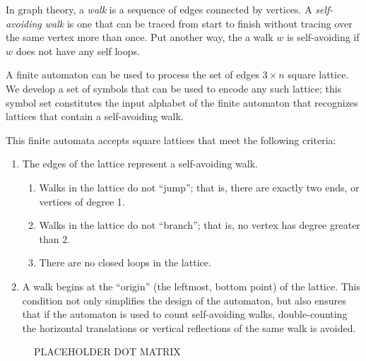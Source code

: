 In graph theory, a \emph{walk} is a sequence of edges connected by vertices. A \emph{self-avoiding walk} is one that can be traced from start to finish without tracing over the same vertex more than once. Put another way, the a walk $w$ is self-avoiding if $w$ does not have any self loops.

A finite automaton can be used to process the set of edges $3\times n$ square lattice. We develop a set of symbols that can be used to encode any such lattice; this symbol set constitutes the input alphabet of the finite automaton that recognizes lattices that contain a self-avoiding walk.

This finite automata accepts square lattices that meet the following criteria:
\begin{enumerate}
\item The edges of the lattice represent a self-avoiding walk.
\begin{enumerate}
\item Walks in the lattice do not ``jump''; that is, there are exactly two ends, or vertices of degree 1.
\item Walks in the lattice do not ``branch''; that is, no vertex has degree greater than 2.
\item There are no closed loops in the lattice.
\end{enumerate}
\item A walk begins at the ``origin'' (the leftmost, bottom point) of the lattice. This condition not only simplifies the design of the automaton, but also ensures that if the automaton is used to count self-avoiding walks, double-counting the horizontal translations or vertical reflections of the same walk is avoided.
\end{enumerate}



\begin{figure}
\begin{center}
\end{center}
\caption{PLACEHOLDER DOT MATRIX}
\end{figure}
